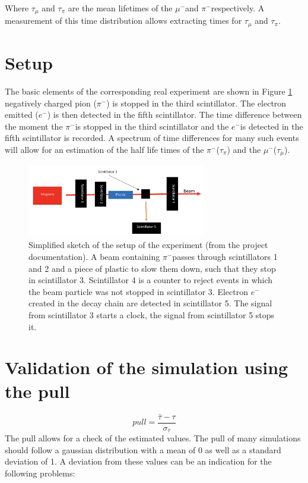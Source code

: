 \documentclass[11pt, a4paper, oneside]{book}
\newcommand{\electron}{$e^{-}$}
\newcommand{\pion}{$\pi^{-}$}
\newcommand{\muon}{$\mu^{-}$}
\begin{document}
Where $\tau_{\mu}$ and $\tau_{\pi}$ are the mean lifetimes of the \muon and \pion respectively. A measurement of this time distribution allows extracting times for $\tau_{\mu}$ and $\tau_{\pi}$.

\section{Setup}

The basic elements of the corresponding real experiment are shown in Figure \ref{fig:experimental_setup} negatively charged pion (\pion) is stopped in the third scintillator. The electron emitted (\electron) is then detected in the fifth scintillator. The time difference between the moment the \pion is stopped in the third scintillator and the \electron is detected in the fifth scintillator is recorded. A spectrum of time differences for many such events will allow for an estimation of the half life times of the \pion ($\tau_{\pi}$) and the \muon ($\tau_{\mu}$).

\begin{figure}[h]
\begin{center}
\includegraphics[width=0.7\textwidth]{images/experimental_setup.png}
\end{center}
\caption{Simplified sketch of the setup of the experiment (from the project documentation). A beam containing \pion passes through scintillators 1 and 2 and a piece of plastic to slow them down, such that they stop in scintillator 3. Scintillator 4 is a counter to reject events in which the beam particle was not stopped in scintillator 3. Electron \electron created in the decay chain are detected in scintillator 5. The signal from scintillator 3 starts a clock, the signal from scintillator 5 stops it.}
\label{fig:experimental_setup}
\end{figure}

\section{Validation of the simulation using the pull}
\begin{equation}
    \si{pull} = \frac{\bar{\tau} - \tau}{\sigma_{\bar{\tau}}}
    \label{eq:pull}
\end{equation}
The pull allows for a check of the estimated values. The pull of many simulations should follow a gaussian distribution with a mean of 0 as well as a standard deviation of 1. A deviation from these values can be an indication for the following problems:
\end{document}

